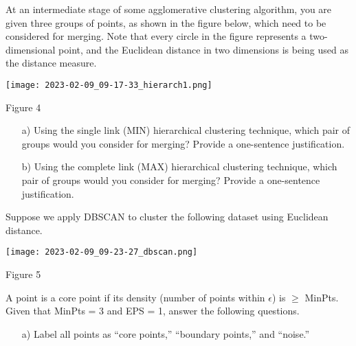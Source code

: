 \documentclass[11pt]{article}
\begin{document}
\begin{itemize}
At an intermediate stage of some agglomerative clustering algorithm, you are given three groups of points, as shown in the figure below, which need to be considered for merging. Note that every circle in the figure represents a two-dimensional point, and the Euclidean distance in two dimensions is being used as the distance measure.
\begin{center}
\texttt{[image: 2023-02-09\_09-17-33\_hierarch1.png]}
  \begin{center} Figure 4 \end{center}
\end{center}
\begin{enumerate}
  \item[a)]	Using the single link (MIN) hierarchical clustering technique, which pair of groups would you consider for merging? Provide a one-sentence justification.
  \item[b)]	Using the complete link (MAX) hierarchical clustering technique, which pair of groups would you consider for merging? Provide a one-sentence justification.
\end{enumerate}
Suppose we apply DBSCAN to cluster the following dataset using Euclidean distance.
\begin{center}
  \texttt{[image: 2023-02-09\_09-23-27\_dbscan.png]}
\begin{center} Figure 5 \end{center}
\end{center}
A point is a core point if its density (number of points within $\epsilon$) is $\geq$ MinPts. 
Given that MinPts = 3 and
EPS = 1, answer the following questions.
\begin{enumerate}
  \item[a)] Label all points as “core points,” “boundary points,” and “noise.”

\end{enumerate}
\end{itemize}
\end{document}
